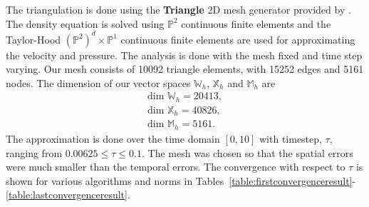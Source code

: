 \documentclass[letterpaper]{erdc}
\begin{document}
The triangulation is done using the \textbf{Triangle} 2D mesh generator provided by \cite{shewchuk1996triangle}.  The density equation is solved using $\mathbb{P}^2$ continuous finite elements and the Taylor-Hood $\left(\mathbb{P}^2\right)^d\times \mathbb{P}^1$ continuous finite elements are used for approximating the velocity and pressure.  The analysis is done with the mesh fixed and time step varying.  Our mesh consists of 10092 triangle elements, with 15252 edges and 5161 nodes.  The dimension of our vector spaces $\mathbb{W}_h$, $\mathbb{X}_h$ and $\mathbb{M}_h$ are
\begin{align}
  \mbox{dim }\mathbb{W}_h = 20413,\\
  \mbox{dim }\mathbb{X}_h = 40826,\\
  \mbox{dim }\mathbb{M}_h = 5161.
\end{align}
The approximation is done over the time domain $[0,10]$ with timestep, $\tau$, ranging from $0.00625\leq \tau \leq 0.1$.  The mesh was chosen so that the spatial errors were much smaller than the temporal errors.  The convergence with respect to $\tau$ is shown for various algorithms and norms in Tables~\ref{table:firstconvergenceresult}-\ref{table:lastconvergenceresult}.

%
%
\end{document}
